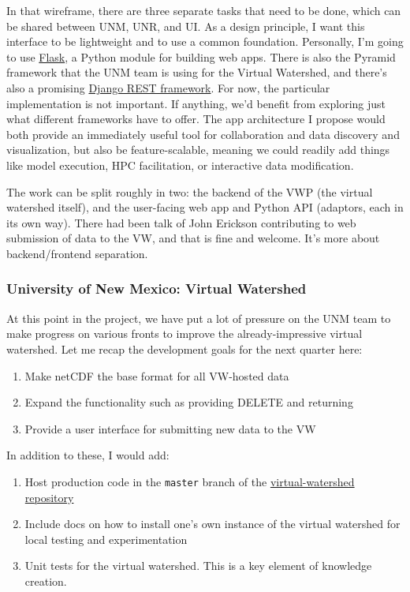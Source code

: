 \documentclass[
11pt, %
a4paper, %
oneside, %
twoside, %
headinclude,footinclude, %
BCOR5mm, %
]{scrartcl}
\begin{document}
In that wireframe, there are three separate tasks that need to be done, which can be shared
between UNM, UNR, and UI. As a design principle, I want this interface to be lightweight and to
use a common foundation. Personally, I'm going to use 
\href{http://flask.pocoo.org/docs/0.10/}{Flask}, a Python module for building web apps. There is
also the Pyramid framework that the UNM team is using for the Virtual Watershed, and there's 
also a promising \href{http://www.django-rest-framework.org/}{Django REST framework}. For now,
the particular implementation is not important. If anything, we'd benefit from exploring just what
different frameworks have to offer. The app architecture I propose would both provide
an immediately useful tool for collaboration and data discovery and visualization, 
but also be feature-scalable, meaning we could readily add things like model execution, HPC 
facilitation, or interactive data modification.

The work can be split roughly in two: the backend of the VWP (the virtual watershed itself),
and the user-facing web app and Python API (adaptors, each in its own way). There had been talk
of John Erickson contributing to web submission of data to the VW, and that is fine and welcome.
It's more about backend/frontend separation.

\subsubsection{University of New Mexico: Virtual Watershed} %
\label{ssub:UNM_webtool}

At this point in the project, we have put a lot of pressure on the UNM team to make progress
on various fronts to improve the already-impressive virtual watershed. Let me recap the 
development goals for the next quarter here:

\begin{enumerate}
    \item Make netCDF the base format for all VW-hosted data
    \item Expand the functionality such as providing DELETE and returning 
    \item Provide a user interface for submitting new data to the VW
\end{enumerate}

In addition to these, I would add:

\begin{enumerate}
    \item Host production code in the \texttt{master} branch of the \href{https://github.com/tri-state-epscor/virtual-watershed}{virtual-watershed repository}
    \item Include docs on how to install one's own instance of the virtual watershed for local 
        testing and experimentation
    \item Unit tests for the virtual watershed. This is a key element of knowledge creation.
\end{enumerate}
\end{document}
